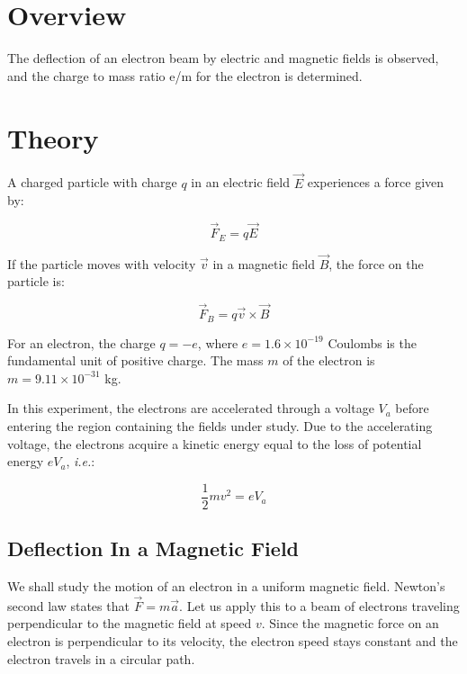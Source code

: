 \section{Overview}

The deflection of an electron beam by electric and magnetic fields is
observed, and the charge to mass ratio e/m for the electron is
determined.


\section{Theory}
A charged particle with charge $q$ in an electric field $\vec{E}$
experiences a force given by:

\begin{equation}
\vec{F}_E = q \vec{E}
\end{equation}


If the particle moves with velocity $\vec{v}$ in a
magnetic field $\vec{B}$, the force on the particle is:

\begin{equation}
\label{lorentz}
\vec{F}_B = q \vec{v} \times \vec{B}
\end{equation}

For an electron, the charge $q = -e$, where $e = 1.6 \times 10^{-19}$ Coulombs
is the fundamental unit of positive charge. The mass $m$ of the electron
is $m = 9.11 \times 10^{-31}$ kg.

In this experiment, the electrons are accelerated through a voltage
$V_a$ before entering the region containing the fields
under study. Due to the accelerating voltage, the electrons acquire a
kinetic energy equal to the loss of potential energy $eV_a$, {\em i.e.}:

\begin{equation}
\label{energy}
\frac{1}{2} mv^{2} = eV_a
\end{equation}

\subsection{Deflection In a Magnetic Field}

We shall study the motion of an electron in a uniform magnetic field.
Newton's second law states that $\vec{F} = m\vec{a}$. Let us apply
this to a beam of electrons traveling perpendicular to the magnetic
field at speed $v$. Since the magnetic force on an electron is
perpendicular to its velocity, the electron speed stays constant and
the electron travels in a circular path.

